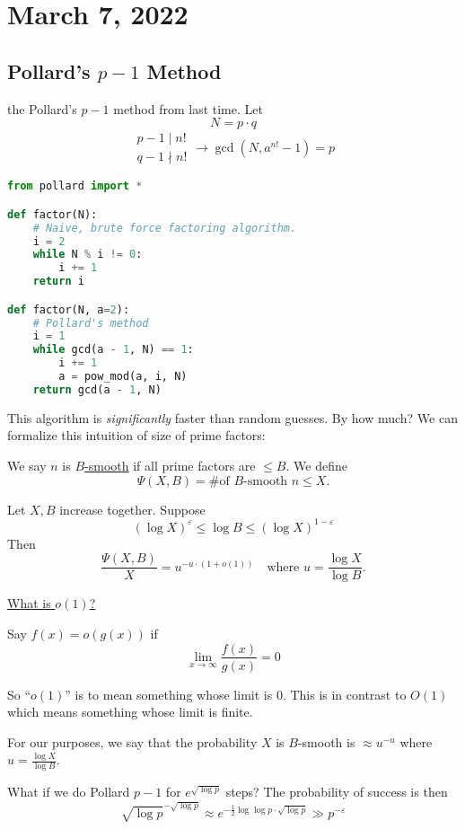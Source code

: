 \section{March 7, 2022}
\subsection{Pollard's \texorpdfstring{$p-1$}{p-1} Method}
\recall the Pollard's $p-1$ method from last time. Let
\[N = p\cdot q\]
\[\begin{array}{c}
        p-1\mid n! \\
        q-1\nmid n!
    \end{array}\rightarrow \gcd(N, a^{n!}-1) = p\]

\begin{lstlisting}[language=Python]
from pollard import * 

def factor(N):
    # Naive, brute force factoring algorithm.
    i = 2
    while N % i != 0:
        i += 1
    return i

def factor(N, a=2):
    # Pollard's method
    i = 1
    while gcd(a - 1, N) == 1:
        i += 1
        a = pow_mod(a, i, N)
    return gcd(a - 1, N)
\end{lstlisting}

This algorithm is \emph{significantly} faster than random guesses. By how much? We can formalize this intuition of size of prime factors:
\begin{definition}
    We say $n$ is \ul{$B$-smooth} if all prime factors are $\leq B$. We define
    \[\Psi(X, B) = \text{\# of $B$-smooth $n\leq X$}.\]
\end{definition}
\begin{theorem}
    Let $X, B$ increase together. Suppose \[(\log X)^\varepsilon \leq \log B \leq (\log X)^{1-\varepsilon}\]
    Then
    \[\frac{\Psi(X, B)}{X} = u^{-u\cdot (1+o(1))}\quad\text{where }u = \frac{\log X}{\log B}.\]
\end{theorem}
\ul{What is $o(1)$?}
\begin{definition}
    Say $f(x) = o(g(x))$ if
    \[\lim_{x\to\infty}\frac{f(x)}{g(x)} = 0\]
\end{definition}
So ``$o(1)$'' is to mean something whose limit is $0$. This is in contrast to $O(1)$ which means something whose limit is finite.

For our purposes, we say that the probability $X$ is $B$-smooth is $\approx u^{-u}$ where $u = \frac{\log X}{\log B}$.

What if we do Pollard $p-1$ for $e^{\sqrt{\log p}}$ steps? The probability of success is then \[\sqrt{\log p}^{-\sqrt{\log p}}\approx e^{-\frac{1}{2}\log\log p\cdot \sqrt{\log p}} \gg p^{-\varepsilon}\]

